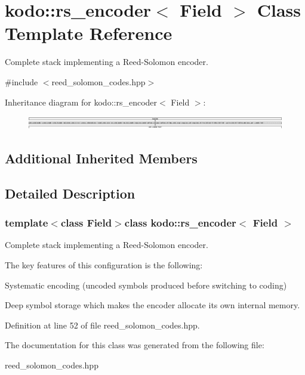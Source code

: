 \hypertarget{classkodo_1_1rs__encoder}{\section{kodo\-:\-:rs\-\_\-encoder$<$ Field $>$ Class Template Reference}
\label{classkodo_1_1rs__encoder}
}


Complete stack implementing a Reed-\/\-Solomon encoder.  




{\ttfamily \#include $<$reed\-\_\-solomon\-\_\-codes.\-hpp$>$}

Inheritance diagram for kodo\-:\-:rs\-\_\-encoder$<$ Field $>$\-:\begin{figure}[H]
\begin{center}
\leavevmode
\includegraphics[height=0.581717cm]{classkodo_1_1rs__encoder}
\end{center}
\end{figure}
\subsection*{Additional Inherited Members}


\subsection{Detailed Description}
\subsubsection*{template$<$class Field$>$class kodo\-::rs\-\_\-encoder$<$ Field $>$}

Complete stack implementing a Reed-\/\-Solomon encoder. 

The key features of this configuration is the following\-:
\begin{DoxyItemize}
\item Systematic encoding (uncoded symbols produced before switching to coding)
\item Deep symbol storage which makes the encoder allocate its own internal memory. 
\end{DoxyItemize}

Definition at line 52 of file reed\-\_\-solomon\-\_\-codes.\-hpp.



The documentation for this class was generated from the following file\-:\begin{DoxyCompactItemize}
\item 
reed\-\_\-solomon\-\_\-codes.\-hpp\end{DoxyCompactItemize}
